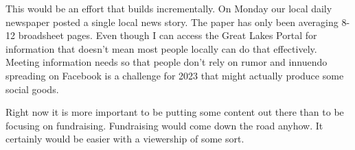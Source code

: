This would be an effort that builds incrementally. On Monday our local
daily newspaper posted a single local news story. The paper has only
been averaging 8-12 broadsheet pages. Even though I can access the Great
Lakes Portal for information that doesn't mean most people locally can
do that effectively. Meeting information needs so that people don't rely
on rumor and innuendo spreading on Facebook is a challenge for 2023 that
might actually produce some social goods.

Right now it is more important to be putting some content out there than
to be focusing on fundraising. Fundraising would come down the road
anyhow. It certainly would be easier with a viewership of some sort.
